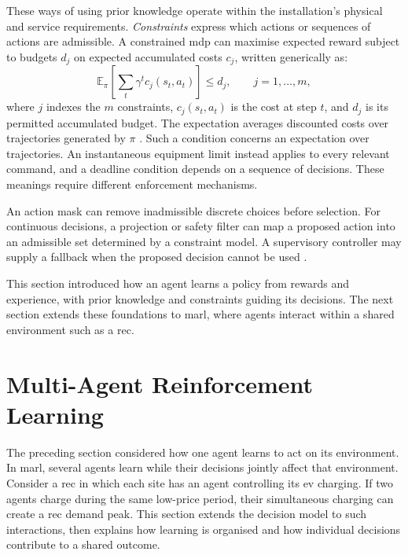 These ways of using prior knowledge operate within the installation's physical and service requirements. \emph{Constraints} express which actions or sequences of actions are admissible. A constrained \gls{mdp} can maximise expected reward subject to budgets $d_j$ on expected accumulated costs $c_j$, written generically as:
\begin{equation}
\mathbb E_\pi\!\left[\sum_t\gamma^t c_j(s_t,a_t)\right]\leq d_j,
\qquad j=1,\ldots,m,
\label{eq:ch2-cmdp}
\end{equation}
where $j$ indexes the $m$ constraints, $c_j(s_t,a_t)$ is the cost at step $t$, and $d_j$ is its permitted accumulated budget. The expectation averages discounted costs over trajectories generated by $\pi$ \parencite{achiam2017cpo}. Such a condition concerns an expectation over trajectories. An instantaneous equipment limit instead applies to every relevant command, and a deadline condition depends on a sequence of decisions. These meanings require different enforcement mechanisms.

An action mask can remove inadmissible discrete choices before selection. For continuous decisions, a projection or safety filter can map a proposed action into an admissible set determined by a constraint model. A supervisory controller may supply a fallback when the proposed decision cannot be used \parencite{dalal2018safe,elsayedaly2021shielding}.

This section introduced how an agent learns a policy from rewards and experience, with prior knowledge and constraints guiding its decisions. The next section extends these foundations to \gls{marl}, where agents interact within a shared environment such as a \gls{rec}.

\FloatBarrier
\section{Multi-Agent Reinforcement Learning}
\label{sec:ch2-marl}

The preceding section considered how one agent learns to act on its environment. In \gls{marl}, several agents learn while their decisions jointly affect that environment. Consider a \gls{rec} in which each site has an agent controlling its \gls{ev} charging. If two agents charge during the same low-price period, their simultaneous charging can create a \gls{rec} demand peak. This section extends the decision model to such interactions, then explains how learning is organised and how individual decisions contribute to a shared outcome.

